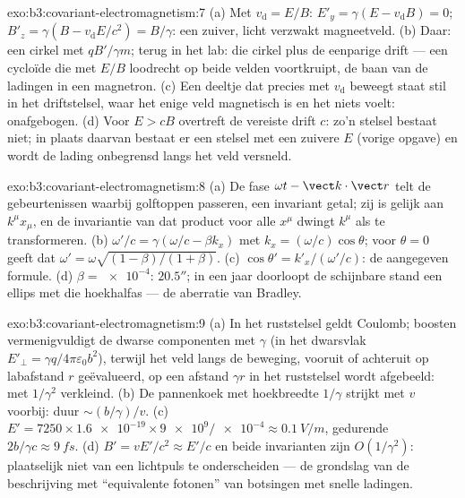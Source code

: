 \begin{solution}{exo:b3:covariant-electromagnetism:7}
(a) Met $v_{\text{d}} = E/B$: $E'_y = \gamma(E - v_{\text{d}}B) =
0$; $B'_z = \gamma(B - v_{\text{d}}E/c^2) = B/\gamma$: een zuiver, licht
verzwakt magneetveld. (b) Daar: een cirkel met $qB'/\gamma m$; terug in
het lab: die cirkel plus de eenparige drift --- een cycloïde die met
$E/B$ loodrecht op beide velden voortkruipt, de baan van de ladingen in
een magnetron. (c) Een deeltje dat precies met $v_{\text{d}}$ beweegt
staat stil in het driftstelsel, waar het enige veld magnetisch is en het
niets voelt: onafgebogen. (d) Voor $E > cB$ overtreft de vereiste drift
$c$: zo'n stelsel bestaat niet; in plaats daarvan bestaat er een stelsel
met een zuivere $E$ (vorige opgave) en wordt de lading onbegrensd langs
het veld versneld.
\end{solution}

\begin{solution}{exo:b3:covariant-electromagnetism:8}
(a) De fase $\omega t - \vect k\cdot\vect r$ telt de gebeurtenissen
waarbij golftoppen passeren, een invariant getal; zij is gelijk aan
$k^\mu x_\mu$, en de invariantie van dat product voor alle $x^\mu$ dwingt
$k^\mu$ als  te transformeren. (b) $\omega'/c = \gamma(\omega/c -
\beta k_x)$ met $k_x = (\omega/c)\cos\theta$; voor $\theta = 0$ geeft
dat $\omega' = \omega\sqrt{(1-\beta)/(1+\beta)}$. (c) $\cos\theta' =
k'_x/(\omega'/c)$: de aangegeven formule. (d) $\beta = \num{e-4}$:
$20.5''$; in een jaar doorloopt de schijnbare stand een ellips met die
hoekhalfas --- de aberratie van Bradley.
\end{solution}

\begin{solution}{exo:b3:covariant-electromagnetism:9}
(a) In het ruststelsel geldt Coulomb; boosten vermenigvuldigt de dwarse
componenten met $\gamma$ (in het dwarsvlak $E'_\perp = \gamma
q/4\pi\varepsilon_0b^2$), terwijl het veld langs de beweging, vooruit of
achteruit op labafstand $r$ geëvalueerd, op een afstand $\gamma r$ in het
ruststelsel wordt afgebeeld: met $1/\gamma^2$ verkleind. (b) De
pannenkoek met hoekbreedte $1/\gamma$ strijkt met $v$ voorbij: duur
$\sim (b/\gamma)/v$. (c) $E' = 7250 \times \num{1.6e-19} \times \num{9e9}/\num{e-4} \approx
\qty{0.1}{V/m}$, gedurende $2b/\gamma c \approx \qty{9}{fs}$. (d) $B' = vE'/c^2 \approx E'/c$ en beide
invarianten zijn $O(1/\gamma^2)$: plaatselijk niet van een lichtpuls te
onderscheiden --- de grondslag van de beschrijving met ``equivalente
fotonen'' van botsingen met snelle ladingen.
\end{solution}

